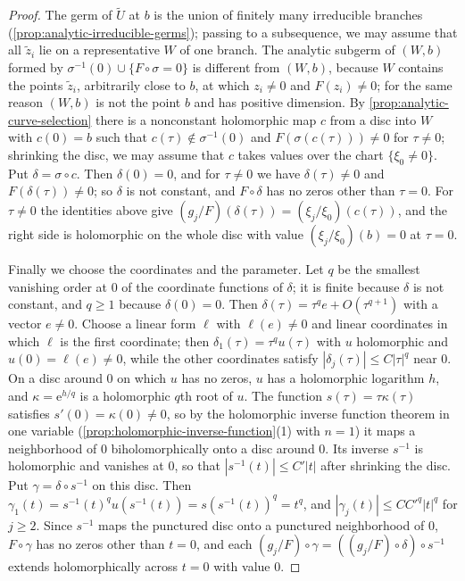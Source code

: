 \begin{proof}
The germ of $\widetilde U$ at $b$ is the union of finitely many irreducible branches (\cref{prop:analytic-irreducible-germs}); passing to a subsequence, we may assume that all $\tilde z_i$ lie on a representative $W$ of one branch. The analytic subgerm of $(W,b)$ formed by $\sigma^{-1}(0)\cup\{F\circ\sigma=0\}$ is different from $(W,b)$, because $W$ contains the points $\tilde z_i$, arbitrarily close to $b$, at which $z_i\neq0$ and $F(z_i)\neq0$; for the same reason $(W,b)$ is not the point $b$ and has positive dimension. By \cref{prop:analytic-curve-selection} there is a nonconstant holomorphic map $c$ from a disc into $W$ with $c(0)=b$ such that $c(\tau)\notin\sigma^{-1}(0)$ and $F(\sigma(c(\tau)))\neq0$ for $\tau\neq0$; shrinking the disc, we may assume that $c$ takes values over the chart $\{\xi_0\neq0\}$. Put $\delta=\sigma\circ c$. Then $\delta(0)=0$, and for $\tau\neq0$ we have $\delta(\tau)\neq0$ and $F(\delta(\tau))\neq0$; so $\delta$ is not constant, and $F\circ\delta$ has no zeros other than $\tau=0$. For $\tau\neq0$ the identities above give $(g_j/F)(\delta(\tau))=(\xi_j/\xi_0)(c(\tau))$, and the right side is holomorphic on the whole disc with value $(\xi_j/\xi_0)(b)=0$ at $\tau=0$.

Finally we choose the coordinates and the parameter. Let $q$ be the smallest vanishing order at $0$ of the coordinate functions of $\delta$; it is finite because $\delta$ is not constant, and $q\geq1$ because $\delta(0)=0$. Then $\delta(\tau)=\tau^qe+O(\tau^{q+1})$ with a vector $e\neq0$. Choose a linear form $\ell$ with $\ell(e)\neq0$ and linear coordinates in which $\ell$ is the first coordinate; then $\delta_1(\tau)=\tau^qu(\tau)$ with $u$ holomorphic and $u(0)=\ell(e)\neq0$, while the other coordinates satisfy $|\delta_j(\tau)|\leq C|\tau|^q$ near $0$. On a disc around $0$ on which $u$ has no zeros, $u$ has a holomorphic logarithm $h$, and $\kappa=\mathrm e^{h/q}$ is a holomorphic $q$th root of $u$. The function $s(\tau)=\tau\kappa(\tau)$ satisfies $s'(0)=\kappa(0)\neq0$, so by the holomorphic inverse function theorem in one variable (\cref{prop:holomorphic-inverse-function}(1) with $n=1$) it maps a neighborhood of $0$ biholomorphically onto a disc around $0$. Its inverse $s^{-1}$ is holomorphic and vanishes at $0$, so that $|s^{-1}(t)|\leq C'|t|$ after shrinking the disc. Put $\gamma=\delta\circ s^{-1}$ on this disc. Then $\gamma_1(t)=s^{-1}(t)^qu(s^{-1}(t))=s(s^{-1}(t))^q=t^q$, and $|\gamma_j(t)|\leq CC'^q|t|^q$ for $j\geq2$. Since $s^{-1}$ maps the punctured disc onto a punctured neighborhood of $0$, $F\circ\gamma$ has no zeros other than $t=0$, and each $(g_j/F)\circ\gamma=((g_j/F)\circ\delta)\circ s^{-1}$ extends holomorphically across $t=0$ with value $0$.
\end{proof}

